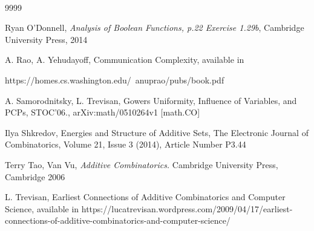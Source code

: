 \documentclass[12pt]{amsart}%
\theoremstyle{definition}
\begin{document}
\



\smallskip

\begin{thebibliography}{9999}



 Ryan O'Donnell, \emph{Analysis of Boolean Functions, p.22 Exercise 1.29b}, 
Cambridge University Press, 2014

 A. Rao, A. Yehudayoff, Communication Complexity, available in 

https://homes.cs.washington.edu/~anuprao/pubs/book.pdf


 A. Samorodnitsky, L. Trevisan, Gowers Uniformity, Influence of Variables, and PCPs, STOC'06., arXiv:math/0510264v1 [math.CO]  

 Ilya Shkredov, Energies and Structure of Additive Sets, The Electronic Journal of Combinatorics, Volume 21, Issue 3 (2014), Article Number P3.44

 Terry Tao, Van Vu,  \emph{Additive Combinatorics.} Cambridge University Press, Cambridge 2006

 L. Trevisan, Earliest Connections of Additive Combinatorics and Computer Science, available in https://lucatrevisan.wordpress.com/2009/04/17/earliest-connections-of-additive-combinatorics-and-computer-science/





\end{thebibliography}
\end{document}
